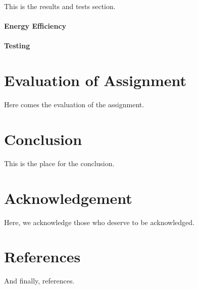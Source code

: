 \documentclass{article}
\begin{document}
This is the results and tests section.

\subsection{Energy Efficiency}

\subsection{Testing}

\part{Evaluation of Assignment}

Here comes the evaluation of the assignment.

\part{Conclusion}

This is the place for the conclusion.

\part{Acknowledgement}

Here, we acknowledge those who deserve to be acknowledged.

\part{References}

And finally, references.
\end{document}
